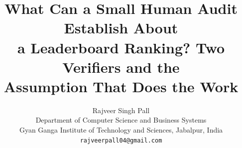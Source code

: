 \documentclass{article}
\title{What Can a Small Human Audit Establish About\\
a Leaderboard Ranking? Two Verifiers and the\\
Assumption That Does the Work}
\author{
  Rajveer Singh Pall \\
  Department of Computer Science and Business Systems \\
  Gyan Ganga Institute of Technology and Sciences, Jabalpur, India \\
  \texttt{rajveerpall04@gmail.com}
}
\begin{document}
\maketitle












{\small


}

\appendix

\end{document}
